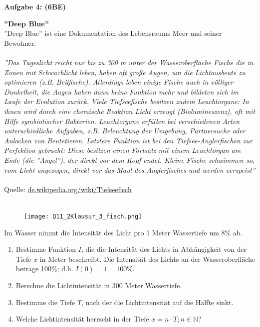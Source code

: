 \documentclass[a4paper,12pt]{article}
\newcommand{\Aufgabe}[1]{
  {
  \vspace*{0.5cm}
  \textsf{\textbf{Aufgabe #1}}
  \vspace*{0.2cm}
  
  }
}
\begin{document}
\vspace{2cm}

\Aufgabe{4: (6BE)} \textbf{''Deep Blue''}\\

''Deep Blue'' ist eine Dokumentation des Lebensraums Meer und seiner Bewohner. \\
   \\ 
\textit{''Das Tageslicht reicht nur bis zu 300 m unter der Wasseroberfläche Fische die in Zonen mit Schwachlicht leben, haben oft große Augen, um die Lichtausbeute zu optimieren (z.B. Beilfische). Allerdings leben einige Fische auch in völliger Dunkelheit, die Augen haben dann keine Funktion mehr und bildeten sich im Laufe der Evolution zurück. Viele Tiefseefische besitzen zudem Leuchtorgane: In ihnen wird durch eine chemische Reaktion Licht erzeugt (Biolumineszenz), oft mit Hilfe symbiotischer Bakterien. Leuchtorgane erfüllen bei verschiedenen Arten unterschiedliche Aufgaben, z.B. Beleuchtung der Umgebung, Partnersuche oder Anlocken von Beutetieren. Letztere Funktion ist bei den Tiefsee-Anglerfischen zur Perfektion gebracht: Diese besitzen einen Fortsatz mit einem Leuchtorgan am Ende (die ''Angel''), der direkt vor dem Kopf endet. Kleine Fische schwimmen so, vom Licht angezogen, direkt vor das Maul des Anglerfisches und werden verspeist''}\\
\\
Quelle: \href{https://de.wikipedia.org/wiki/Tiefseefisch}{de.wikipedia.org/wiki/Tiefseefisch}\\
\\


  \begin{figure}[H]
    \centering
    \texttt{[image: Q11\_2Klausur\_3\_fisch.png]}
  \end{figure}

Im Wasser nimmt die Intensität des Licht pro 1 Meter Wassertiefe um 8\% ab.

\begin{enumerate}[label={\alph*)}]
  \item Bestimme Funktion $I$, die die Intensität des Lichts in Abhängigkeit von der Tiefe $x$ in Meter beschreibt. Die Intensität des Lichts an der Wasseroberfläche betrage 100\%; d.h. $I(0)=1=100\%$.

  \item Berechne die Lichtintensität in 300 Meter Wassertiefe.

  \item Bestimme die Tiefe $T$, nach der die Lichtintensität auf die Hälfte sinkt. 
  \item Welche Lichtintensität herrscht in der Tiefe $x = n\cdot T; n \in \mathbb{N}$?
\end{enumerate}
\end{document}
